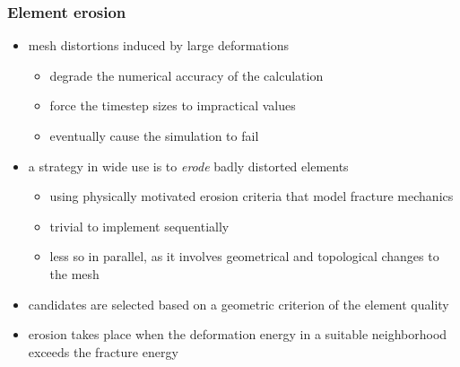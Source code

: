 \begin{frame}[fragile]
%
  \frametitle{Element erosion}
%
  \begin{itemize}
%
  \item mesh distortions induced by large deformations
    \begin{itemize}
    \item degrade the numerical accuracy of the calculation
    \item force the timestep sizes to impractical values
    \item eventually cause the simulation to fail
    \end{itemize}
%
  \item a strategy in wide use is to {\em erode} badly distorted elements
    \begin{itemize}
    \item using physically motivated erosion criteria that model fracture mechanics
    \item trivial to implement sequentially
    \item less so in parallel, as it involves geometrical and topological changes to the mesh
    \end{itemize}
%
  \item candidates are selected based on a geometric criterion of the element quality
  \item erosion takes place when the deformation energy in a suitable neighborhood exceeds the
    fracture energy
%
  \end{itemize}
%
\end{frame}

